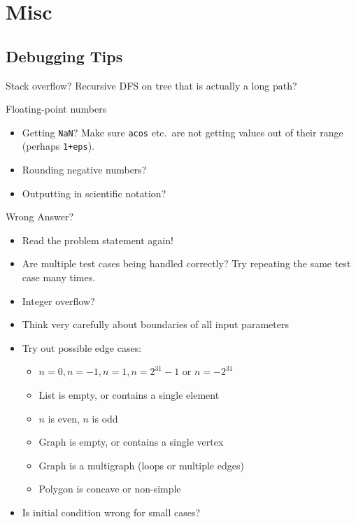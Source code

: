 \section{Misc}
  \subsection{Debugging Tips}
    \begin{myitemize}
      \item Stack overflow? Recursive DFS on tree that is actually a long path?
      \item Floating-point numbers
        \begin{itemize}
          \item Getting \texttt{NaN}? Make sure \texttt{acos} etc.\ are
            not getting values out of their range (perhaps
            \texttt{1+eps}).
          \item Rounding negative numbers?
          \item Outputting in scientific notation?
        \end{itemize}
      \item Wrong Answer?
        \begin{itemize}
          \item Read the problem statement again!
          \item Are multiple test cases being handled correctly?
            Try repeating the same test case many times.
          \item Integer overflow?
          \item Think very carefully about boundaries of all input parameters
          \item Try out possible edge cases:
            \begin{itemize}
              \item $n=0, n=-1, n=1, n=2^{31}-1$ or $n=-2^{31}$
              \item List is empty, or contains a single element
              \item $n$ is even, $n$ is odd
              \item Graph is empty, or contains a single vertex
              \item Graph is a multigraph (loops or multiple edges)
              \item Polygon is concave or non-simple
            \end{itemize}
          \item Is initial condition wrong for small cases?

\end{itemize}
\end{myitemize}

